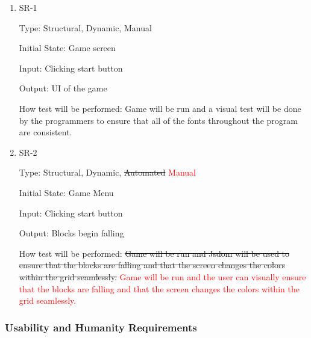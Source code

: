 \documentclass[12pt, titlepage]{article}
\begin{document}
\begin{enumerate}

\item{SR-1\\}

Type: Structural, Dynamic, Manual
					
Initial State: Game screen
					
Input: Clicking start button 
					
Output: UI of the game
					
How test will be performed: Game will be run and a visual test will be done by the programmers to ensure that all of the fonts throughout the program are consistent. 

\item{SR-2\\}

Type: Structural, Dynamic, \sout{Automated} \textcolor{red}{Manual}
					
Initial State: Game Menu 
					
Input: Clicking start button 
					
Output: Blocks begin falling
					
How test will be performed: \sout{Game will be run and Jsdom will be used to ensure that the blocks are falling and that the screen changes the colors within the grid seamlessly.}
\textcolor{red}{Game will be run and the user can visually ensure that the blocks are falling and that the screen changes the colors within the grid seamlessly.} 

\end{enumerate}

\subsubsection{Usability and Humanity Requirements}
\end{document}
